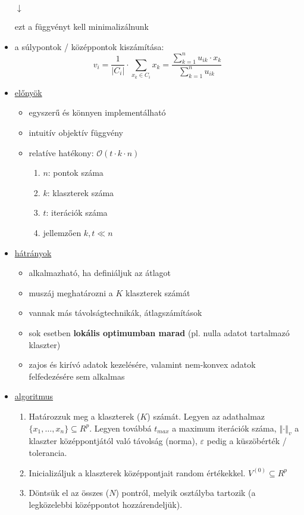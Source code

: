 \documentclass[a4paper, 11pt]{article}
\newcommand\norm[1]{\left\Vert#1\right\Vert}
\begin{document}
\begin{itemize}
\begin{center}
		$\downarrow$
		
		ezt a függvényt kell minimalizálnunk
	\end{center}
	\item a súlypontok / középpontok kiszámítása:
	\[ v_i = \dfrac{1}{|C_i|} \cdot \sum\limits_{x_k\in C_i} x_k = \dfrac{\sum\limits_{k = 1}^n u_{ik} \cdot x_k}{\sum\limits_{k = 1}^n u_{ik}} \]
	\item \underline{előnyök}
	\begin{itemize}
		\item egyszerű és könnyen implementálható
		\item intuitív objektív függvény
		\item relatíve hatékony: $\mathcal{O}(t \cdot k \cdot n)$
		\begin{enumerate}[--]
			\item $n$: pontok száma
			\item $k$: klaszterek száma
			\item $t$: iterációk száma
			\item jellemzően $k, t \ll n$
		\end{enumerate}
	\end{itemize}
	\item \underline{hátrányok}
	\begin{itemize}
		\item alkalmazható, ha definiáljuk az átlagot
		\item muszáj meghatározni a $K$ klaszterek számát
		\item vannak más távolságtechnikák, átlagszámítások
		\item sok esetben \textbf{lokális optimumban marad} (pl. nulla adatot tartalmazó klaszter)
		\item zajos és kirívó adatok kezelésére, valamint nem-konvex adatok felfedezésére sem alkalmas
	\end{itemize}
	\item \underline{algoritmus}
	\begin{enumerate}[1. lépés:]
		\item Határozzuk meg a klaszterek ($K$) számát. Legyen az adathalmaz $\{x_1, \dots, x_n\} \subseteq R^p$. Legyen továbbá $t_{max}$ a maximum iterációk száma, $\norm{\cdot}_v$ a klaszter középpontjától való távolság (norma), $\varepsilon$ pedig a küszöbérték / tolerancia.
		\item Inicializáljuk a klaszterek középpontjait random értékekkel.
		$ V^{(0)} \subseteq R^p $
		\item Döntsük el az összes ($N$) pontról, melyik osztályba tartozik (a legközelebbi középpontot hozzárendeljük).

\end{enumerate}
\end{itemize}
\end{document}
